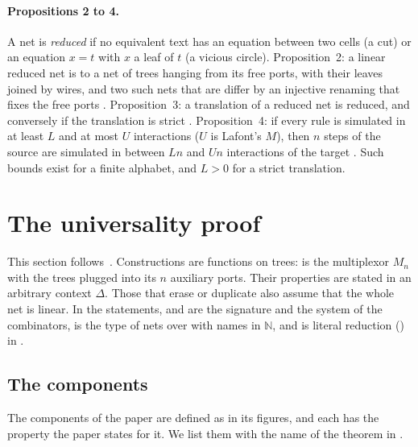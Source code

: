 \documentclass[11pt,a4paper]{article}
\newcommand{\Equiv}{\cod{Equiv}}
\newcommand{\pp}[1]{\cite[#1]{lafont1997}}
\begin{document}
\paragraph{Propositions 2 to 4.}
A net is \emph{reduced} if no equivalent text has an equation between two cells (a cut) or an
equation $x = t$ with $x$ a leaf of $t$ (a vicious circle). Proposition~2: a linear reduced net
is \Equiv{} to a net of trees hanging from its free ports, with their leaves joined by wires,
and two such nets that are \Equiv{} differ by an injective renaming that fixes the free ports
\pp{p.~79}. Proposition~3: a
translation of a reduced net is reduced, and conversely if the translation is strict
\pp{p.~80}. Proposition~4: if every rule is simulated in at least $L$ and at most $U$
interactions ($U$ is Lafont's $M$), then $n$ steps of the source are simulated in between $Ln$
and $Un$ interactions of the target \pp{p.~81}. Such bounds exist for a finite alphabet, and $L > 0$ for a strict
translation.

\section{The universality proof}
\label{sec:universality}

This section follows~\cite[Section~2]{lafont1997}. Constructions are functions on trees:
 is the multiplexor $M_n$ with the trees  plugged into its $n$ auxiliary
ports. Their properties are stated in an arbitrary context $\Delta$. Those that erase or
duplicate also assume that the whole net is linear. In the statements,  and
 are the signature and the system of the combinators,  is the type of
nets over  with names in $\mathbb N$, and  is literal reduction
() in .

\subsection{The components}
\label{sec:components}

The components of the paper are defined as in its figures, and each has the property the paper
states for it. We list them with the name of the theorem in .
\end{document}
